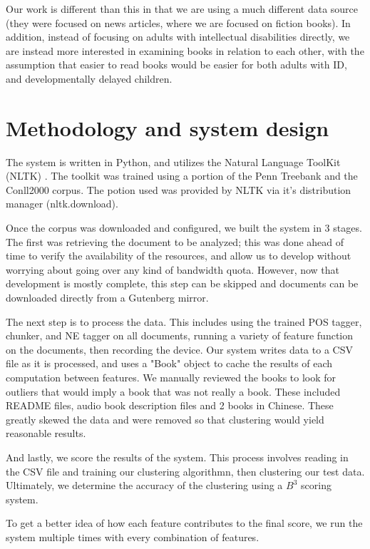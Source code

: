 \documentclass[]{article}
\begin{document}
Our work is different than this in that we are using a much different data source (they were focused on news articles, where we are focused on fiction books).
In addition, instead of focusing on adults with intellectual disabilities directly, we are instead more interested in examining books in relation to each other, with the assumption that easier to read books would be easier for both adults with ID, and developmentally delayed children.

\section{Methodology and system design}

The system is written in Python, and utilizes the Natural Language ToolKit (NLTK) \cite{loper2002nltk}.
The toolkit was trained using a portion of the Penn Treebank and the Conll2000 corpus.
The potion used was provided by NLTK via it's distribution manager (nltk.download).

Once the corpus was downloaded and configured, we built the system in 3 stages.
The first was retrieving the document to be analyzed; this was done ahead of time to verify the availability of the resources, and allow us to develop without worrying about going over any kind of bandwidth quota.
However, now that development is mostly complete, this step can be skipped and documents can be downloaded directly from a Gutenberg mirror.

The next step is to process the data.
This includes using the trained POS tagger, chunker, and NE tagger on all documents, running a variety of feature function on the documents, then recording the device.
Our system writes data to a CSV file as it is processed, and uses a "Book" object to cache the results of each computation between features.
We manually reviewed the books to look for outliers that would imply a book that was not really a book.
These included README files, audio book description files and 2 books in Chinese.
These greatly skewed the data and were removed so that clustering would yield reasonable results.

And lastly, we score the results of the system.
This process involves reading in the CSV file and training our clustering algorithmn, then clustering our test data.
Ultimately, we determine the accuracy of the clustering using a $B^3$ scoring system.

To get a better idea of how each feature contributes to the final score, we run the system multiple times with every combination of features.
\end{document}
